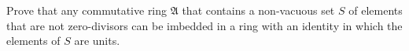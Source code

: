 Prove that any commutative ring $\mathfrak{A}$ that contains a non-vacuous set $S$ of elements that are not zero-divisors can be imbedded in a ring with an identity in which the elements of $S$ are units.

